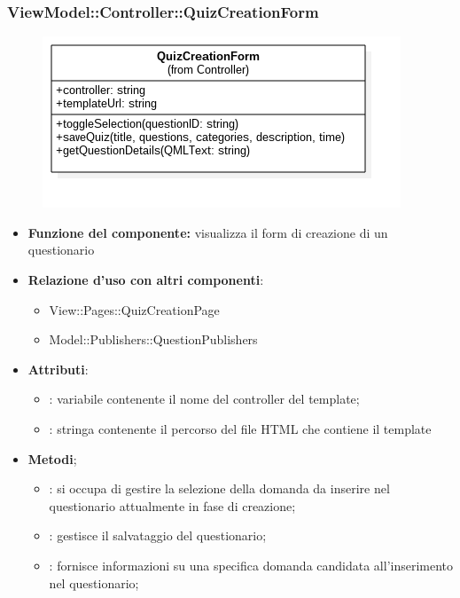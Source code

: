  \subsubsection{ViewModel::Controller::QuizCreationForm}
 \begin{figure}[h!]
\begin{center}
	\includegraphics[scale=0.4]{../images/ViewModel/Controller/QuizCreationForm.png}
\end{center}
\end{figure}
 \begin{itemize}
 \item\textbf{Funzione del componente:} visualizza il form di creazione di un questionario
 \item\textbf{Relazione d'uso con altri componenti}:
 \begin{itemize}
 	\item View::Pages::QuizCreationPage
 	\item Model::Publishers::QuestionPublishers
 \end{itemize}
 \item\textbf{Attributi}:
 	\begin{itemize}
 		\item{}: variabile contenente il nome del controller del template;\\
		
		\item{}: stringa contenente il percorso del file HTML che contiene il template\\
 	\end{itemize}
 	\item\textbf{Metodi};
 	\begin{itemize}
 		\item{}: si occupa di gestire la selezione della domanda da inserire nel questionario attualmente in fase di creazione;\\
 		\item{}:
 		gestisce il salvataggio del questionario;\\
 		\item{}: fornisce informazioni su una specifica domanda candidata all'inserimento nel questionario;\\
 	\end{itemize}
 \end{itemize}
\newpage
 
